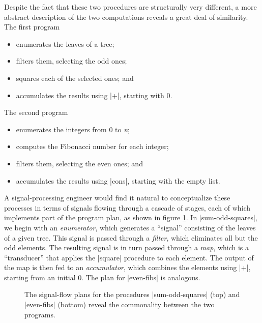 Despite the fact that these two procedures are structurally very
different, a more abstract description of the two computations reveals
a great deal of similarity.  The first program
\begin{itemize}
\item enumerates the leaves of a tree;
\item filters them, selecting the odd ones;
\item squares each of the selected ones; and
\item accumulates the results using \scheme|+|, starting with 0.
\end{itemize}
The second program
\begin{itemize}
\item enumerates the integers from 0 to \textit{n};
\item computes the Fibonacci number for each integer;
\item filters them, selecting the even ones; and
\item accumulates the results using \scheme|cons|, starting with the
  empty list.
\end{itemize}

A signal-processing engineer would find it natural to conceptualize
these processes in terms of signals flowing through a cascade of
stages, each of which implements part of the program plan, as shown in
figure \ref{fig:2.7}.  In \scheme|sum-odd-squares|, we begin with an
\textit{enumerator}, which generates a ``signal'' consisting of the
leaves of a given tree.  This signal is passed through a
\textit{filter}, which eliminates all but the odd elements.  The
resulting signal is in turn passed through a \textit{map}, which is a
``transducer'' that applies the \scheme|square| procedure to each
element.  The output of the map is then fed to an
\textit{accumulator}, which combines the elements using \scheme|+|,
starting from an initial 0.  The plan for \scheme|even-fibs| is
analogous.

\begin{schemeregion}
  \begin{figure}
    \centering
    \caption{The signal-flow plans for the procedures
      \scheme|sum-odd-squares| (top) and \scheme|even-fibs| (bottom)
      reveal the commonality between the two programs.}
    \label{fig:2.7}
  \end{figure}
\end{schemeregion}

